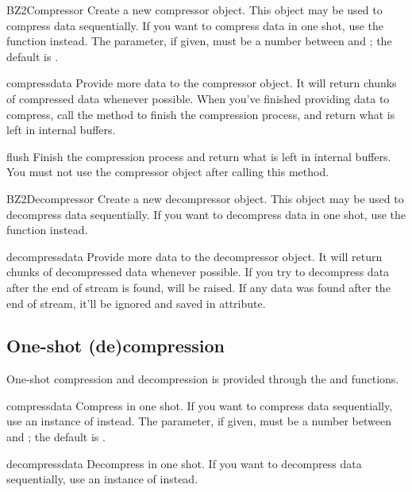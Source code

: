 \begin{classdesc}{BZ2Compressor}{}
Create a new compressor object. This object may be used to compress
data sequentially. If you want to compress data in one shot, use the
 function instead. The  parameter,
if given, must be a number between  and ; the default
is .
\end{classdesc}

\begin{methoddesc}[BZ2Compressor]{compress}{data}
Provide more data to the compressor object. It will return chunks of compressed
data whenever possible. When you've finished providing data to compress, call
the  method to finish the compression process, and return what
is left in internal buffers.
\end{methoddesc}

\begin{methoddesc}[BZ2Compressor]{flush}{}
Finish the compression process and return what is left in internal buffers. You
must not use the compressor object after calling this method.
\end{methoddesc}

\begin{classdesc}{BZ2Decompressor}{}
Create a new decompressor object. This object may be used to decompress
data sequentially. If you want to decompress data in one shot, use the
 function instead.
\end{classdesc}

\begin{methoddesc}[BZ2Decompressor]{decompress}{data}
Provide more data to the decompressor object. It will return chunks of
decompressed data whenever possible. If you try to decompress data after the
end of stream is found,  will be raised. If any data was
found after the end of stream, it'll be ignored and saved in
 attribute.
\end{methoddesc}


\subsection{One-shot (de)compression}

One-shot compression and decompression is provided through the
 and  functions.

\begin{funcdesc}{compress}{data}
Compress  in one shot. If you want to compress data sequentially,
use an instance of  instead. The 
parameter, if given, must be a number between  and ;
the default is .
\end{funcdesc}

\begin{funcdesc}{decompress}{data}
Decompress  in one shot. If you want to decompress data
sequentially, use an instance of  instead.
\end{funcdesc}
